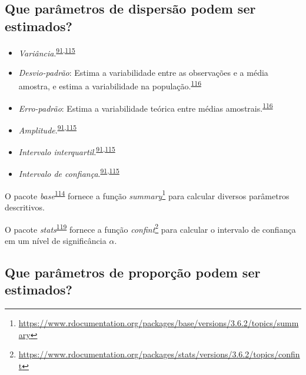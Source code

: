\documentclass[
  a4paper,
]{book}
\renewcommand{\href}[2]{#2\footnote{\url{#1}}}
\newenvironment{infobox}[1]
  {
  \begin{itemize}
  \renewcommand{\labelitemi}{
    \raisebox{-.7\height}[0pt][0pt]{
      {\setkeys{Gin}{width=3em,keepaspectratio}
        \texttt{[image: \#1]}}
    }
  }
  \setlength{\fboxsep}{1em}
  \begin{blackbox}
  \item
  }
  {
  \end{blackbox}
  \end{itemize}
  }
\begin{document}
\hypertarget{que-paruxe2metros-de-dispersuxe3o-podem-ser-estimados}{%
\subsection{Que parâmetros de dispersão podem ser estimados?}\label{que-paruxe2metros-de-dispersuxe3o-podem-ser-estimados}}

\begin{itemize}
\item
  \emph{Variância}.\textsuperscript{\protect\hyperlink{ref-Ali2016}{91},\protect\hyperlink{ref-kanji2006}{115}}
\item
  \emph{Desvio-padrão}: Estima a variabilidade entre as observações e a média amostra, e estima a variabilidade na população.\textsuperscript{\protect\hyperlink{ref-Curran-Everett2008}{116}}
\item
  \emph{Erro-padrão}: Estima a variabilidade teórica entre médias amostrais.\textsuperscript{\protect\hyperlink{ref-Curran-Everett2008}{116}}
\item
  \emph{Amplitude}.\textsuperscript{\protect\hyperlink{ref-Ali2016}{91},\protect\hyperlink{ref-kanji2006}{115}}
\item
  \emph{Intervalo interquartil}.\textsuperscript{\protect\hyperlink{ref-Ali2016}{91},\protect\hyperlink{ref-kanji2006}{115}}
\item
  \emph{Intervalo de confiança}.\textsuperscript{\protect\hyperlink{ref-Ali2016}{91},\protect\hyperlink{ref-kanji2006}{115}}
\end{itemize}

\begin{infobox}{images/Rlogo}
O pacote \emph{base}\textsuperscript{\protect\hyperlink{ref-base-6}{114}} fornece a função \href{https://www.rdocumentation.org/packages/base/versions/3.6.2/topics/summary}{\emph{summary}} para calcular diversos parâmetros descritivos.

\end{infobox}

\begin{infobox}{images/Rlogo}
O pacote \emph{stats}\textsuperscript{\protect\hyperlink{ref-stats-4}{119}} fornece a função \href{https://www.rdocumentation.org/packages/stats/versions/3.6.2/topics/confint}{\emph{confint}} para calcular o intervalo de confiança em um nível de significância \(\alpha\).

\end{infobox}

\hypertarget{que-paruxe2metros-de-proporuxe7uxe3o-podem-ser-estimados}{%
\subsection{Que parâmetros de proporção podem ser estimados?}\label{que-paruxe2metros-de-proporuxe7uxe3o-podem-ser-estimados}}
\end{document}
